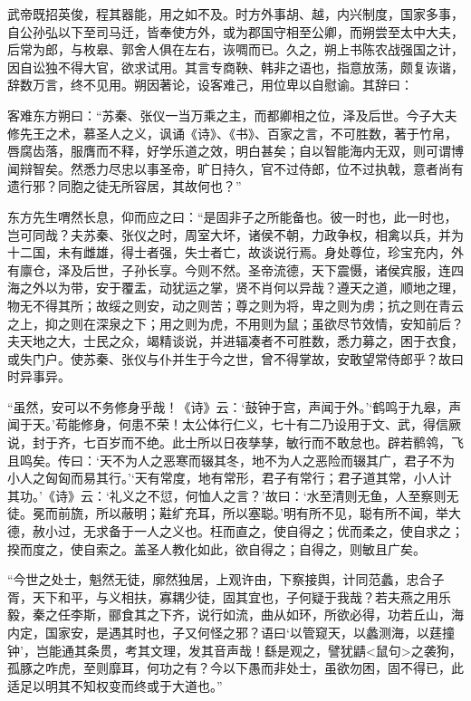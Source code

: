 \documentclass[]{article}
\begin{document}
武帝既招英俊，程其器能，用之如不及。时方外事胡、越，内兴制度，国家多事，自公孙弘以下至司马迁，皆奉使方外，或为郡国守相至公卿，而朔尝至太中大夫，后常为郎，与枚皋、郭舍人俱在左右，诙啁而已。久之，朔上书陈农战强国之计，因自讼独不得大官，欲求试用。其言专商鞅、韩非之语也，指意放荡，颇复诙谐，辞数万言，终不见用。朔因著论，设客难己，用位卑以自慰谕。其辞曰：

客难东方朔曰：``苏秦、张仪一当万乘之主，而都卿相之位，泽及后世。今子大夫修先王之术，慕圣人之义，讽诵《诗》、《书》、百家之言，不可胜数，著于竹帛，唇腐齿落，服膺而不释，好学乐道之效，明白甚矣；自以智能海内无双，则可谓博闻辩智矣。然悉力尽忠以事圣帝，旷日持久，官不过侍郎，位不过执戟，意者尚有遗行邪？同胞之徒无所容居，其故何也？''

东方先生喟然长息，仰而应之曰：``是固非子之所能备也。彼一时也，此一时也，岂可同哉？夫苏秦、张仪之时，周室大坏，诸侯不朝，力政争权，相禽以兵，并为十二国，未有雌雄，得士者强，失士者亡，故谈说行焉。身处尊位，珍宝充内，外有廪仓，泽及后世，子孙长享。今则不然。圣帝流德，天下震慑，诸侯宾服，连四海之外以为带，安于覆盂，动犹运之掌，贤不肖何以异哉？遵天之道，顺地之理，物无不得其所；故绥之则安，动之则苦；尊之则为将，卑之则为虏；抗之则在青云之上，抑之则在深泉之下；用之则为虎，不用则为鼠；虽欲尽节效情，安知前后？夫天地之大，士民之众，竭精谈说，并进辐凑者不可胜数，悉力募之，困于衣食，或失门户。使苏秦、张仪与仆并生于今之世，曾不得掌故，安敢望常侍郎乎？故曰时异事异。

``虽然，安可以不务修身乎哉！《诗》云：`鼓钟于宫，声闻于外。'`鹤鸣于九皋，声闻于天。'苟能修身，何患不荣！太公体行仁义，七十有二乃设用于文、武，得信厥说，封于齐，七百岁而不绝。此士所以日夜孳孳，敏行而不敢怠也。辟若鹡鸰，飞且鸣矣。传曰：`天不为人之恶寒而辍其冬，地不为人之恶险而辍其广，君子不为小人之匈匈而易其行。'`天有常度，地有常形，君子有常行；君子道其常，小人计其功。'《诗》云：`礼义之不愆，何恤人之言？'故曰：`水至清则无鱼，人至察则无徒。冕而前旒，所以蔽明；黈纩充耳，所以塞聪。'明有所不见，聪有所不闻，举大德，赦小过，无求备于一人之义也。枉而直之，使自得之；优而柔之，使自求之；揆而度之，使自索之。盖圣人教化如此，欲自得之；自得之，则敏且广矣。

``今世之处士，魁然无徒，廓然独居，上观许由，下察接舆，计同范蠡，忠合子胥，天下和平，与义相扶，寡耦少徒，固其宜也，子何疑于我哉？若夫燕之用乐毅，秦之任李斯，郦食其之下齐，说行如流，曲从如环，所欲必得，功若丘山，海内定，国家安，是遇其时也，子又何怪之邪？语曰`以管窥天，以蠡测海，以莛撞钟'，岂能通其条贯，考其文理，发其音声哉！繇是观之，譬犹鼱\textless{}鼠句\textgreater{}之袭狗，孤豚之咋虎，至则靡耳，何功之有？今以下愚而非处士，虽欲勿困，固不得已，此适足以明其不知权变而终或于大道也。''
\end{document}
